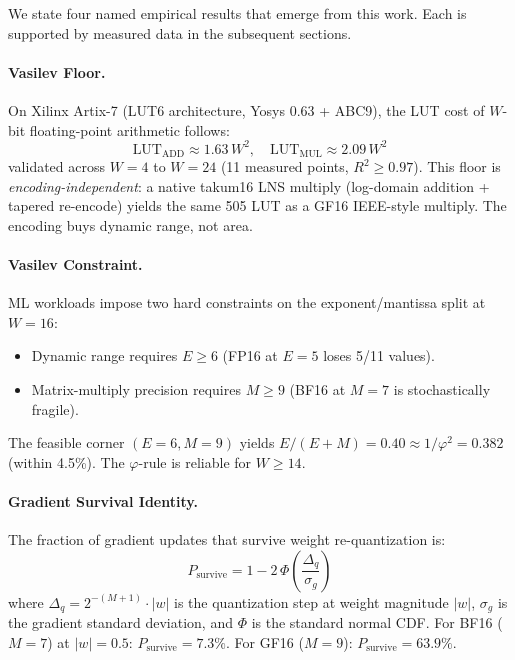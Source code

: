 \documentclass[11pt]{article}
\begin{document}
We state four named empirical results that emerge from this work. Each
is supported by measured data in the subsequent sections.

\paragraph{Vasilev Floor.}
On Xilinx Artix-7 (LUT6 architecture, Yosys 0.63 + ABC9), the LUT cost
of $W$-bit floating-point arithmetic follows:
\begin{equation}
\text{LUT}_{\text{ADD}} \approx 1.63\,W^2, \quad
\text{LUT}_{\text{MUL}} \approx 2.09\,W^2
\end{equation}
validated across $W{=}4$ to $W{=}24$ (11 measured points, $R^2 \geq 0.97$).
This floor is
\emph{encoding-independent}: a native takum16 LNS multiply (log-domain
addition + tapered re-encode) yields the same 505 LUT as a GF16 IEEE-style
multiply. The encoding buys dynamic range, not area.

\paragraph{Vasilev Constraint.}
ML workloads impose two hard constraints on the exponent/mantissa split
at $W{=}16$:
\begin{itemize}
\item Dynamic range requires $E \geq 6$ (FP16 at $E{=}5$ loses 5/11 values).
\item Matrix-multiply precision requires $M \geq 9$ (BF16 at $M{=}7$ is
  stochastically fragile).
\end{itemize}
The feasible corner $(E{=}6, M{=}9)$ yields $E/(E{+}M) = 0.40 \approx
1/\varphi^2 = 0.382$ (within 4.5\%). The $\varphi$-rule is reliable for
$W \geq 14$.

\paragraph{Gradient Survival Identity.}
The fraction of gradient updates that survive weight re-quantization is:
\begin{equation}
P_{\text{survive}} = 1 - 2\,\Phi\!\left(\frac{\Delta_q}{\sigma_g}\right)
\end{equation}
where $\Delta_q = 2^{-(M+1)} \cdot |w|$ is the quantization step at
weight magnitude $|w|$, $\sigma_g$ is the gradient standard deviation,
and $\Phi$ is the standard normal CDF. For BF16 ($M{=}7$) at $|w|{=}0.5$:
$P_{\text{survive}} = 7.3\%$. For GF16 ($M{=}9$): $P_{\text{survive}} = 63.9\%$.
\end{document}

